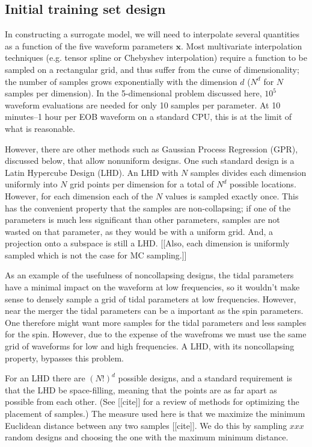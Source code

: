 \documentclass[prd,aps,letter,twocolumn,floatfix,notitlepage,nofootinbib]{revtex4-1}
\begin{document}
\subsection{Initial training set design}

In constructing a surrogate model, we will need to interpolate several quantities as a function of the five
waveform parameters ${\bm x}$.
Most multivariate interpolation techniques (e.g. tensor spline or Chebyshev interpolation) 
require a function to be sampled on a rectangular grid, and thus suffer from the curse of dimensionality; 
the number of samples grows exponentially with the dimension $d$ ($N^d$ for $N$ samples per dimension).
In the 5-dimensional problem discussed here, $10^5$ waveform evaluations are needed for only 10 samples per parameter.
At 10 minutes--1 hour per EOB waveform on a standard CPU, this is at the limit of what is reasonable.

However, there are other methods such as Gaussian Process Regression (GPR), discussed below, that allow nonuniform designs.
One such standard design is a Latin Hypercube Design (LHD). An LHD with $N$ samples divides each dimension uniformly into $N$
grid points per dimension for a total of $N^d$ possible locations. However, for each dimension each of the $N$ values is sampled 
exactly once. This has the convenient property that the samples are non-collapsing; if one of the parameters is much less 
significant than other parameters, samples are not wasted on that parameter, as they would be with a uniform grid. And, a projection
onto a subspace is still a LHD. [[Also, each dimension is uniformly sampled which is not the case for MC sampling.]]

As an example of the usefulness of noncollapsing designs, the tidal parameters have a minimal impact on the waveform
at low frequencies, so it wouldn't make sense to densely sample a grid of tidal parameters at low frequencies. However, near
the merger the tidal parameters can be a important as the spin parameters. One therefore might want more samples for the tidal
parameters and less samples for the spin. However, due to the expense of the wavefroms we must use the same grid of waveforms 
for low and high frequencies. A LHD, with its noncollapsing property, bypasses this problem. 

For an LHD there are $(N!)^d$ possible designs, and a standard requirement is that the LHD be space-filling, meaning that the 
points are as far apart as possible from each other. (See [[cite]] for a review of methods for optimizing the placement of samples.) 
The measure used here is that we maximize the minimum Euclidean distance between any two samples [[cite]]. We do this by 
sampling $xxx$ random designs and choosing the one with the maximum minimum distance.
\end{document}
